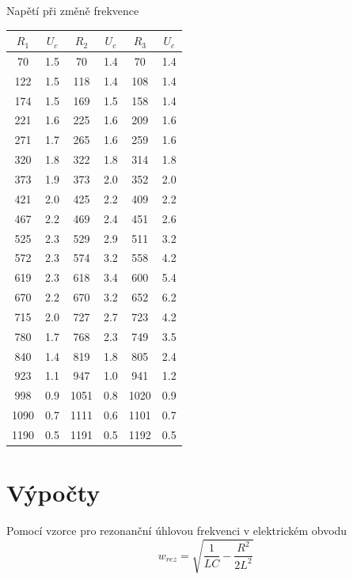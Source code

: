 \documentclass[10pt]{article}
\begin{document}
\begin{minipage}[t]{0.45\textwidth}
\begin{flushright}

Napětí při změně frekvence \\[.2cm]

\begin{tabular}{|c|c|c|c|c|c|} \hline
$R_1$ & $U_c$ & $R_2$ & $U_c$ & $R_3$ & $U_c$ \\
\hline
70 & 1.5 & 70 & 1.4 & 70 & 1.4 \\
122 & 1.5 & 118 & 1.4 & 108 & 1.4 \\
174 & 1.5 & 169 & 1.5 & 158 & 1.4 \\
221 & 1.6 & 225 & 1.6 & 209 & 1.6 \\
271 & 1.7 & 265 & 1.6 & 259 & 1.6 \\
320 & 1.8 & 322 & 1.8 & 314 & 1.8 \\
373 & 1.9 & 373 & 2.0 & 352 & 2.0 \\
421 & 2.0 & 425 & 2.2 & 409 & 2.2 \\
467 & 2.2 & 469 & 2.4 & 451 & 2.6 \\
525 & 2.3 & 529 & 2.9 & 511 & 3.2 \\
572 & 2.3 & 574 & 3.2 & 558 & 4.2 \\
619 & 2.3 & 618 & 3.4 & 600 & 5.4 \\
670 & 2.2 & 670 & 3.2 & 652 & 6.2 \\
715 & 2.0 & 727 & 2.7 & 723 & 4.2 \\
780 & 1.7 & 768 & 2.3 & 749 & 3.5 \\
840 & 1.4 & 819 & 1.8 & 805 & 2.4 \\
923 & 1.1 & 947 & 1.0 & 941 & 1.2 \\
998 & 0.9 & 1051 & 0.8 & 1020 & 0.9 \\
1090 & 0.7 & 1111 & 0.6 & 1101 & 0.7 \\
1190 & 0.5 & 1191 & 0.5 & 1192 & 0.5 \\
\hline
\end{tabular}

\end{flushright}
\end{minipage}



\section{Výpočty}
Pomocí vzorce pro rezonanční úhlovou frekvenci v elektrickém obvodu
\begin{equation}
w_{rez} = \sqrt{\frac{1}{LC} - \frac{R^2}{2L^2}}
\end{equation}
\end{document}
